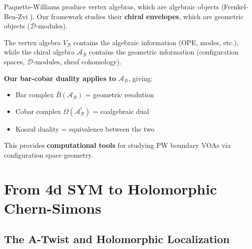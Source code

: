 \begin{remark}\label{rem:PW-connection}
Paquette-Williams produce vertex algebras, which are algebraic objects (Frenkel-Ben-Zvi 
\cite{FrenkelBenZvi04}). Our framework studies their \textbf{chiral envelopes}, which are 
geometric objects ($\mathcal{D}$-modules).

\begin{center}
\end{center}

The vertex algebra $V_{\mathcal{B}}$ contains the algebraic information (OPE, modes, 
etc.), while the chiral algebra $\mathcal{A}_{\mathcal{B}}$ contains the geometric 
information (configuration spaces, $\mathcal{D}$-modules, sheaf cohomology).

\textbf{Our bar-cobar duality applies to} $\mathcal{A}_{\mathcal{B}}$, giving:
\begin{itemize}
\item Bar complex $\bar{B}(\mathcal{A}_{\mathcal{B}})$ = geometric resolution
\item Cobar complex $\Omega(\mathcal{A}_{\mathcal{B}}^!)$ = coalgebraic dual
\item Koszul duality = equivalence between the two
\end{itemize}

This provides \textbf{computational tools} for studying PW boundary VOAs via 
configuration space geometry.
\end{remark}

\section{From 4d SYM to Holomorphic Chern-Simons}

\subsection{The A-Twist and Holomorphic Localization}

